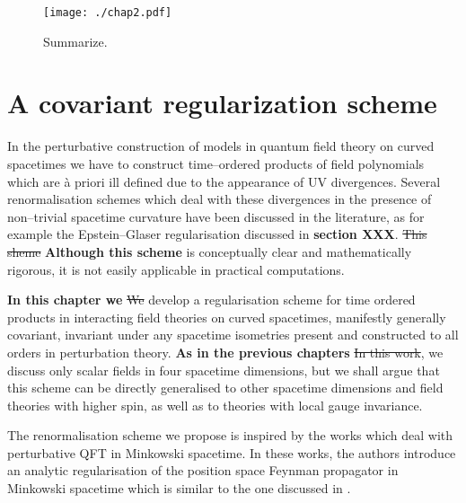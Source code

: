 \documentclass[11pt]{book}
\newcommand{\com}[1]{{\color{red}\bf #1}}
\newcommand{\sbar}[1]{\sout{\color{red} #1}}
\theoremstyle{break}
\begin{document}
\newpage

\begin{figure}
\centering
\texttt{[image: ./chap2.pdf]}
\caption{Summarize.}
\label{fig:chap_2}
\end{figure}


\chapter{A covariant regularization scheme}
\label{p:COV_REG}


In the perturbative construction of models in quantum field theory on curved spacetimes we have to construct time--ordered products of field polynomials which are à priori ill defined due to the appearance of UV divergences. Several renormalisation schemes which deal with these divergences in the presence of non--trivial spacetime curvature have been discussed in the literature, as for example the Epstein--Glaser regularisation discussed in \com{section XXX}.  \sbar{This sheme} \com{Although this scheme} is conceptually clear and mathematically rigorous, it is not easily applicable in practical computations. 


\com{In this chapter we} \sbar{We} develop a regularisation scheme for time ordered products in interacting field theories on curved spacetimes, manifestly generally covariant, invariant under any spacetime isometries present and constructed to all orders in perturbation theory. \com{As in the previous chapters} \sbar{In this work}, we discuss only scalar fields in four spacetime dimensions, but we shall argue that this scheme can be directly generalised to other spacetime dimensions and field theories with higher spin, as well as to theories with local gauge invariance. 


The renormalisation scheme we propose is inspired by the works \cite{keller_dimensional_2010,duetsch_dimensional_2014} which deal with perturbative QFT in Minkowski spacetime. In these works, the authors introduce an analytic regularisation of the position space Feynman propagator in Minkowski spacetime which is similar to the one discussed in \cite{bollini_dimensional_2008}. 



\end{document}

